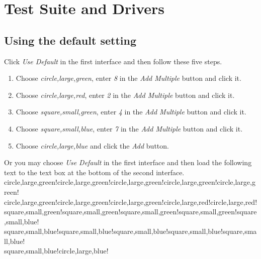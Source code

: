 %
%
%
\section{Test Suite and Drivers}

\subsection{Using the default setting}
Click \emph{Use Default} in the first interface and then follow these five steps. 
\begin{enumerate}[1)]
\item Choose \emph{circle,large,green}, enter \emph{8} in the \emph{Add Multiple} button and click it.
\item Choose \emph{circle,large,red}, enter \emph{2} in the \emph{Add Multiple} button and click it.
\item Choose \emph{square,small,green}, enter \emph{4} in the \emph{Add Multiple} button and click it.
\item Choose \emph{square,small,blue}, enter \emph{7} in the \emph{Add Multiple} button and click it.
\item Choose \emph{circle,large,blue} and click the \emph{Add} button.
\end{enumerate}

Or you may choose \emph{Use Default} in the first interface and then load the following text to the text box at the bottom of the second interface.\\
circle,large,green!circle,large,green!circle,large,green!circle,large,green!circle,large,green!\\circle,large,green!circle,large,green!circle,large,green!circle,large,red!circle,large,red!\\square,small,green!square,small,green!square,small,green!square,small,green!square,small,blue!\\square,small,blue!square,small,blue!square,small,blue!square,small,blue!square,small,blue!\\square,small,blue!circle,large,blue!

